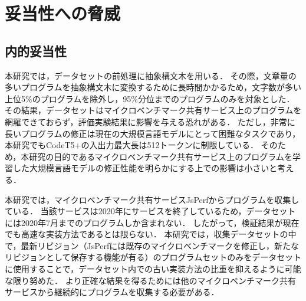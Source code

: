 \documentclass[11pt]{jreport}
\begin{document}

\chapter{妥当性への脅威}\label{chapter:threats}




\section{内的妥当性}


本研究では，データセットの前処理に抽象構文木を用いる．
その際，文章量の多いプログラムを抽象構文木に変換するために長時間かかるため，文字数が多い上位5\%のプログラムを除外し，95\%分位までのプログラムのみを対象とした．
その結果，データセットはマイクロベンチマーク共有サービス上のプログラムを網羅できておらず，評価実験結果に影響を与える恐れがある．
ただし，非常に長いプログラムの修正は現在の大規模言語モデルにとって困難なタスクであり，本研究でもCodeT5+の入出力最大長は512トークンに制限している．
そのため，本研究の目的であるマイクロベンチマーク共有サービス上のプログラムを学習した大規模言語モデルの修正性能を明らかにする上での影響は小さいと考える．

本研究では，マイクロベンチマーク共有サービスJsPerfからプログラムを収集している．
当該サービスは2020年にサービスを終了しているため，データセットには2020年7月までのプログラムしか含まれない．
したがって，検証結果が現在でも高速な実装方法であるとは限らない．
本研究では，収集データセットの中で，最新リビジョン（JsPerfには既存のマイクロベンチマークを修正し，新たなリビジョンとして保存する機能が有る）のプログラムセットのみをデータセットに使用することで，データセット内での古い実装方法の比重を抑えるように可能な限り努めた．
より正確な結果を得るためには他のマイクロベンチマーク共有サービスから継続的にプログラムを収集する必要がある．
\end{document}
